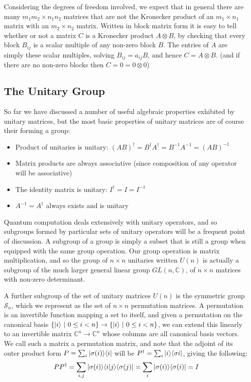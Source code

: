 Considering the degrees of freedom involved, we expect that in general there are many $m_1m_2 \times n_1n_2$ matrices that are not the Kronecker product of an $m_1 \times n_1$ matrix with an $m_2 \times n_2$ matrix. Written in block matrix form it is easy to tell whether or not a matrix $C$ is a Kronecker product $A \otimes B$, by checking that every block $B_{ij}$ is a scalar multiple of any non-zero block $B$. The entries of $A$ are simply these scalar multiples, solving $B_{ij} = a_{ij}B$, and hence $C = A \otimes B$. (and if there are no non-zero blocks then $C = 0 = 0 \otimes 0$)
\subsection{The Unitary Group}
So far we have discussed a number of useful algebraic properties exhibited by unitary matrices, but the most basic properties of unitary matrices are of course their forming a group:
\begin{itemize}
	\item Product of unitaries is unitary: ${(AB)}^\dagger = B^\dagger A^\dagger = B^{-1}A^{-1} = {(AB)}^{-1}$
	\item Matrix products are always associative (since composition of any operator will be associative)
	\item The identity matrix is unitary: $I^\dagger = I = I^{-1}$
	\item $A^{-1} = A^\dagger$ always exists and is unitary
\end{itemize}

Quantum computation deals extensively with unitary operators, and so subgroups formed by particular sets of unitary operators will be a frequent point of discussion. A subgroup of a group is simply a subset that is still a group when equipped with the same group operation. Our group operation is matrix multiplication, and so the group of $n \times n$ unitaries written $U(n)$ is actually a subgroup of the much larger general linear group $GL(n, \mathbb{C})$, of $n \times n$ matrices with non-zero determinant.

A further subgroup of the set of unitary matrices $U(n)$ is the symmetric group $\mathcal{S}_n$, which we represent as the set of $n \times n$ permutation matrices. A permutation is an invertible function mapping a set to itself, and given a permutation on the canonical basis $\{| i \rangle\ |\ 0 \leq i < n\} \to \{| i \rangle\ |\ 0 \leq i < n\}$, we can extend this linearly to an invertible matrix $\mathbb{C}^n \to \mathbb{C}^n$ whose columns are all canonical basis vectors. We call such a matrix a permutation matrix, and note that the adjoint of its outer product form $P = \sum_i | \sigma(i) \rangle\langle i |$ will be $P^{\dagger} = \sum_i | i \rangle\langle \sigma{i} |$, giving the following:
\begin{align*}
	PP^\dagger = \sum_{i,j} | \sigma(i) \rangle\langle i | j \rangle\langle \sigma(j) | = \sum_i | \sigma(i) \rangle\langle \sigma(i) | = I
\end{align*}

